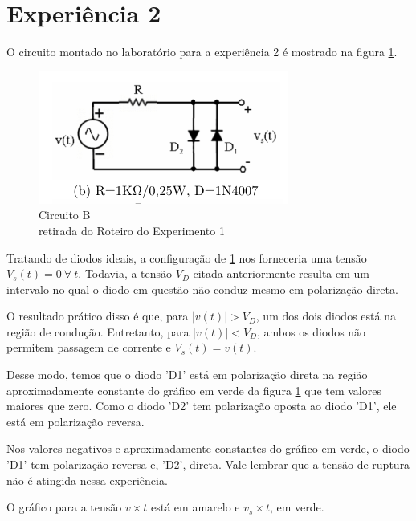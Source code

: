 \documentclass[10pt, final, a4paper]{IEEEtran} %
\begin{document}
\section{Experiência 2}

O circuito montado no laboratório para a experiência 2 é mostrado na figura \ref{cb}.

\begin{figure}[ht!]
	\captionsetup{justification=centering}
	\centering
	\includegraphics[width=0.8\linewidth]{imagens/circuitos_rel/cb.png}
	\caption{Circuito B\\ retirada do Roteiro do Experimento 1}
	\label{cb}
\end{figure}
\FloatBarrier

Tratando de diodos ideais, a configuração de \ref{cb} nos forneceria uma tensão $V_s(t) = 0\ \forall \ t$. Todavia, a tensão $V_D$ citada anteriormente resulta em um intervalo no qual o diodo em questão não conduz mesmo em polarização direta.

O resultado prático disso é que, para $|v(t)| > V_D$, um dos dois diodos está na região de condução. Entretanto, para $|v(t)| < V_D$, ambos os diodos não permitem passagem de corrente e $V_s(t) = v(t)$.

Desse modo, temos que o diodo 'D1' está em polarização direta na região aproximadamente constante do gráfico em verde da figura \ref{cb} que tem valores maiores que zero. Como o diodo 'D2' tem polarização oposta ao diodo 'D1', ele está em polarização reversa.

Nos valores negativos e aproximadamente constantes do gráfico em verde, o diodo 'D1' tem polarização reversa e, 'D2', direta. Vale lembrar que a tensão de ruptura não é atingida nessa experiência.

O gráfico para a tensão $v \times t$ está em amarelo e $v_s \times t$, em verde.
\end{document}
